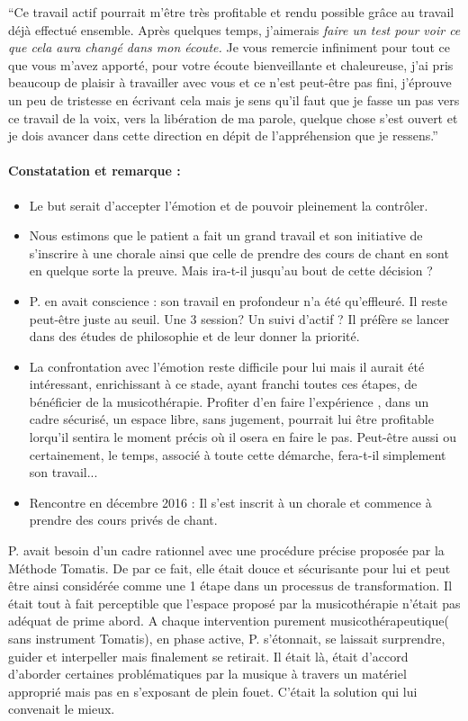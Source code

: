 \documentclass[12pt,french]{report}
\begin{document}
``Ce travail actif pourrait m'être très profitable et rendu possible
grâce au travail déjà effectué ensemble. Après quelques temps, j'aimerais\emph{
faire un test pour voir ce que cela aura changé dans mon écoute.}
Je vous remercie infiniment pour tout ce que vous m'avez apporté,
pour votre écoute bienveillante et chaleureuse, j'ai pris beaucoup
de plaisir à travailler avec vous et ce n'est peut-être pas fini,
j'éprouve un peu de tristesse en écrivant cela mais je sens qu'il
faut que je fasse un pas vers ce travail de la voix, vers la libération
de ma parole, quelque chose s'est ouvert et je dois avancer dans cette
direction en dépit de l'appréhension que je ressens.''

\paragraph{Constatation et remarque :}
\begin{itemize}
\item Le but serait d'accepter l'émotion et de pouvoir pleinement la contrôler. 
\item Nous estimons que le patient a fait un grand travail et son initiative
de s'inscrire à une chorale ainsi que celle de prendre des cours de
chant en sont en quelque sorte la preuve. Mais ira-t-il jusqu'au bout
de cette décision ? 
\item P. en avait conscience : son travail en profondeur n'a été qu'effleuré.
Il reste peut-être juste au seuil. Une 3\textdegree{} session? Un
suivi d'actif ? Il préfère se lancer dans des études de philosophie
et de leur donner la priorité. 
\item La confrontation avec l'émotion reste difficile pour lui mais il aurait
été intéressant, enrichissant à ce stade, ayant franchi toutes ces
étapes, de bénéficier de la musicothérapie. Profiter d'en faire l'expérience
, dans un cadre sécurisé, un espace libre, sans jugement, pourrait
lui être profitable lorqu'il sentira le moment précis où il osera
en faire le pas. Peut-être aussi ou certainement, le temps, associé
à toute cette démarche, fera-t-il simplement son travail...
\item Rencontre en décembre 2016 : Il s'est inscrit à un chorale et commence
à prendre des cours privés de chant.
\end{itemize}
P. avait besoin d'un cadre rationnel avec une procédure précise proposée
par la Méthode Tomatis. De par ce fait, elle était douce et sécurisante
pour lui et peut être ainsi considérée comme une 1\textdegree{} étape
dans un processus de transformation. Il était tout à fait perceptible
que l'espace proposé par la musicothérapie n'était pas adéquat de
prime abord. A chaque intervention purement musicothérapeutique( sans
instrument Tomatis), en phase active, P. s'étonnait, se laissait surprendre,
guider et interpeller mais finalement se retirait. Il était là, était
d'accord d'aborder certaines problématiques par la musique à travers
un matériel approprié mais pas en s'exposant de plein fouet. C'était
la solution qui lui convenait le mieux.
\end{document}
